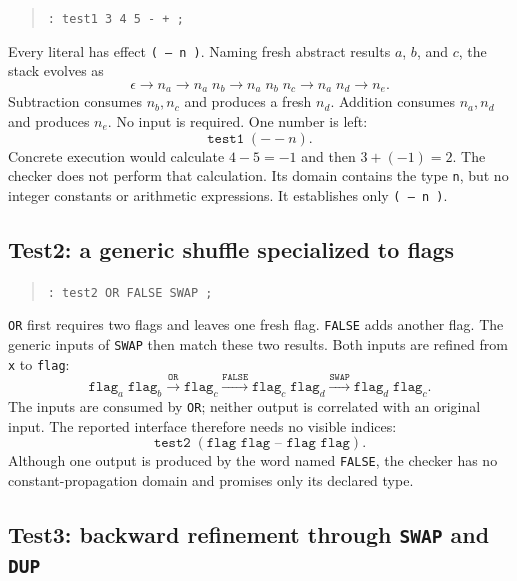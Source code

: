 \documentclass[11pt,a4paper]{article}
\newcommand{\effect}[1]{\mbox{\texttt{#1}}}
\begin{document}
\begin{quote}
\texttt{: test1  3 4 5 - + ;}
\end{quote}
Every literal has effect \effect{( -- n )}.  Naming fresh abstract results
$a$, $b$, and $c$, the stack evolves as
\[
 \epsilon
 \longrightarrow n_a
 \longrightarrow n_a\;n_b
 \longrightarrow n_a\;n_b\;n_c
 \longrightarrow n_a\;n_d
 \longrightarrow n_e.
\]
Subtraction consumes $n_b,n_c$ and produces a fresh $n_d$.  Addition consumes
$n_a,n_d$ and produces $n_e$.  No input is required.  One number is left:
\[
                      \texttt{test1}\;( -- n ).
\]
Concrete execution would calculate $4-5=-1$ and then $3+(-1)=2$.  The checker
does not perform that calculation.  Its domain contains the type \texttt{n},
but no integer constants or arithmetic expressions.  It establishes only
\effect{( -- n )}.

\subsection{Test2: a generic shuffle specialized to flags}

\begin{quote}
\texttt{: test2  OR FALSE SWAP ;}
\end{quote}
\texttt{OR} first requires two flags and leaves one fresh flag.  \texttt{FALSE}
adds another flag.  The generic inputs of \texttt{SWAP} then match these two
results.  Both inputs are refined from \texttt{x} to \texttt{flag}:
\[
 \texttt{flag}_a\;\texttt{flag}_b
 \xrightarrow{\texttt{OR}}
 \texttt{flag}_c
 \xrightarrow{\texttt{FALSE}}
 \texttt{flag}_c\;\texttt{flag}_d
 \xrightarrow{\texttt{SWAP}}
 \texttt{flag}_d\;\texttt{flag}_c.
\]
The inputs are consumed by \texttt{OR}; neither output is correlated with an
original input.  The reported interface therefore needs no visible indices:
\[
           \texttt{test2}\;(\texttt{flag flag -- flag flag}).
\]
Although one output is produced by the word named \texttt{FALSE}, the checker
has no constant-propagation domain and promises only its declared type.

\subsection{Test3: backward refinement through \texttt{SWAP} and
\texttt{DUP}}
\end{document}
